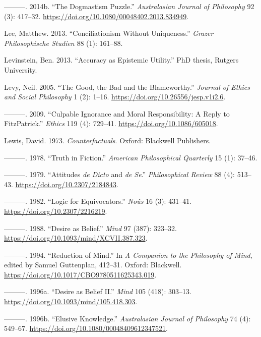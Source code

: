 \documentclass[
  10pt,
  letterpaper,
  twoside]{scrbook}
\newlength{\cslhangindent}
\newenvironment{CSLReferences}[2] %
 {\begin{list}{}{%
  \setlength{\itemindent}{0pt}
  \setlength{\leftmargin}{0pt}
  \setlength{\parsep}{0pt}
  \ifodd #1
   \setlength{\leftmargin}{\cslhangindent}
   \setlength{\itemindent}{-1\cslhangindent}
  \fi
  \setlength{\itemsep}{#2\baselineskip}}}
 {\end{list}}
\begin{document}
\begin{CSLReferences}{1}{0}
---------. 2014b. {``The Dogmastism Puzzle.''} \emph{Australasian
Journal of Philosophy} 92 (3): 417--32.
\url{https://doi.org/10.1080/00048402.2013.834949}.

Lee, Matthew. 2013. {``Conciliationism Without Uniqueness.''}
\emph{Grazer Philosophische Studien} 88 (1): 161--88.

Levinstein, Ben. 2013. {``Accuracy as Epistemic Utility.''} PhD thesis,
Rutgers University.

Levy, Neil. 2005. {``The Good, the Bad and the Blameworthy.''}
\emph{Journal of Ethics and Social Philosophy} 1 (2): 1--16.
\url{https://doi.org/10.26556/jesp.v1i2.6}.

---------. 2009. {``Culpable Ignorance and Moral Responsibility: A Reply
to FitzPatrick.''} \emph{Ethics} 119 (4): 729--41.
\url{https://doi.org/10.1086/605018}.

Lewis, David. 1973. \emph{Counterfactuals}. Oxford: Blackwell
Publishers.

---------. 1978. {``Truth in Fiction.''} \emph{American Philosophical
Quarterly} 15 (1): 37--46.

---------. 1979. {``Attitudes \emph{de Dicto} and \emph{de Se}.''}
\emph{Philosophical Review} 88 (4): 513--43.
\url{https://doi.org/10.2307/2184843}.

---------. 1982. {``Logic for Equivocators.''} \emph{No{û}s} 16 (3):
431--41. \url{https://doi.org/10.2307/2216219}.

---------. 1988. {``Desire as Belief.''} \emph{Mind} 97 (387): 323--32.
\url{https://doi.org/10.1093/mind/XCVII.387.323}.

---------. 1994. {``Reduction of Mind.''} In \emph{A Companion to the
Philosophy of Mind}, edited by Samuel Guttenplan, 412--31. Oxford:
Blackwell. \url{https://doi.org/10.1017/CBO9780511625343.019}.

---------. 1996a. {``Desire as Belief {II}.''} \emph{Mind} 105 (418):
303--13. \url{https://doi.org/10.1093/mind/105.418.303}.

---------. 1996b. {``Elusive Knowledge.''} \emph{Australasian Journal of
Philosophy} 74 (4): 549--67.
\url{https://doi.org/10.1080/00048409612347521}.


\end{CSLReferences}
\end{document}
